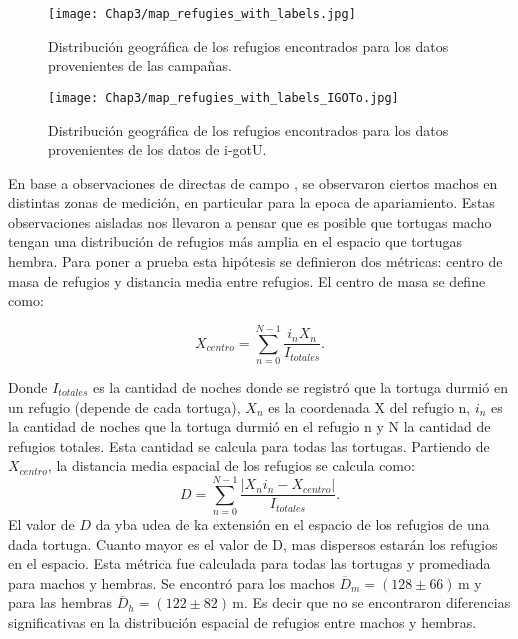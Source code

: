  
\begin{figure}[ht]
    \begin{center}
        \texttt{[image: Chap3/map\_refugies\_with\_labels.jpg]}
        \caption{Distribución geográfica de los refugios encontrados para los datos provenientes de las campañas.}
        \label{fig:refus_campanas_con_labels}
       
        \end{center}
\end{figure}
 
\begin{figure}[ht]
    \begin{center}
        \texttt{[image: Chap3/map\_refugies\_with\_labels\_IGOTo.jpg]}
        \caption{Distribución geográfica de los refugios encontrados para los datos provenientes de los datos de i-gotU.}
        \label{fig:refus_igotu_labels}
       
        \end{center}
\end{figure}
 
En base a observaciones de directas de campo \cite{Erika}, se observaron ciertos machos en distintas zonas de medición, en particular para la epoca de apariamiento. Estas observaciones aisladas nos llevaron a pensar que es posible que  tortugas macho tengan una distribución de refugios más amplia en el espacio que tortugas hembra.  Para poner a prueba esta hipótesis se definieron dos métricas: centro de masa de refugios y distancia media entre refugios. El centro de masa se define como:
\begin{center}
   
 
$$X_{centro}= \sum^{N -1}_{n=0} \frac{i_{n} X_n}{I_{totales}}.$$
\end{center}
Donde $I_{totales}$ es la cantidad de noches donde se registró que la tortuga durmió en un refugio (depende de cada tortuga), $X_n$ es la coordenada X del refugio n, $i_{n}$ es la cantidad de noches que la tortuga durmió en el refugio n y N la cantidad de refugios totales.  Esta cantidad se calcula para todas las tortugas.
Partiendo de $X_{centro}$, la distancia media  espacial de los refugios se calcula como:
$$D = \sum^{N -1}_{n=0} \frac{|X_n i_n - X_{centro}|}{I_{totales}}.$$
\label{eq:distancia_media_refugios}
El valor de $D$ da yba udea de ka extensión en el espacio de los refugios de una dada tortuga. Cuanto mayor es el valor de D, mas dispersos estarán los refugios en el espacio. Esta métrica fue calculada para todas las tortugas y  promediada para  machos y hembras. Se encontró para los machos $\overline{D}_m =  (128\pm66)\,\text{m}$ y para las hembras     $\overline{D}_h = (122\pm82)\,\text{m}$. Es decir que no se encontraron diferencias significativas en la distribución espacial de refugios  entre machos y hembras.
